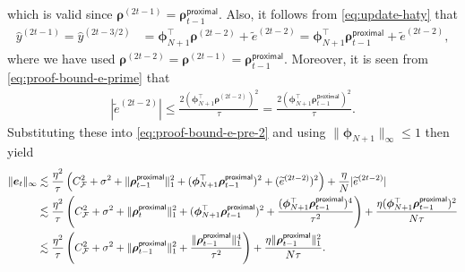 \documentclass[english]{article}
\begin{document}
%
which is valid since $ {\bm \rho}^{(2t-1)} = {\bm \rho}_{t-1}^{\mathsf{proximal}}$.
Also, it follows from \eqref{eq:update-haty} that
%
\begin{align*}
\widehat{y}^{(2t-1)} 
 = \widehat{y}^{(2t-3/2)} 
&=  {\bm \phi}_{N+1}^{\top}{\bm \rho}^{(2t-2)} + \widetilde{e}^{(2t-2)}
=  {\bm \phi}_{N+1}^{\top}{\bm \rho}_{t-1}^{\mathsf{proximal}} + \widetilde{e}^{(2t-2)},
\end{align*}
where we have used ${\bm \rho}^{(2t-2)} = {\bm \rho}^{(2t-1)} = {\bm \rho}_{t-1}^{\mathsf{proximal}}$.
Moreover, it is seen from \eqref{eq:proof-bound-e-prime} that
%
\begin{align*}
|\widetilde{e}^{(2t-2)}|\le \frac{2\left({\bm \phi}_{N+1}^{\top}{\bm \rho}^{(2t-2)}\right)^2}{\tau} = \frac{2\left({\bm \phi}_{N+1}^{\top}{\bm \rho}_{t-1}^{\mathsf{proximal}}\right)^2}{\tau}.
\end{align*}
%
Substituting these into \eqref{eq:proof-bound-e-pre-2} and using $\|\bm{\phi}_{N+1}\|_{\infty}\leq 1$ then yield
%
\begin{align}\label{eq:proof-bound-e}
\|{\bm e}_{t}\|_{\infty}
&\lesssim \frac{\eta^2}{\tau}\left(C_{\mathcal{F}}^2 + \sigma^2 + \|{\bm \rho}_{t-1}^{\mathsf{proximal}}\|_1^2 + ({\bm \phi}_{N+1}^{\top}{\bm \rho}_{t-1}^{\mathsf{proximal}})^2 + (\widetilde{e}^{(2t-2)})^2\right)+ \frac{\eta}{N}|\widetilde{e}^{(2t-2)}|\notag\\
&\lesssim \frac{\eta^2}{\tau}\left(C_{\mathcal{F}}^2 +\sigma^2 + \|{\bm \rho}_t^{\mathsf{proximal}}\|_1^2 + ({\bm \phi}_{N+1}^{\top}{\bm \rho}_{t-1}^{\mathsf{proximal}})^2 + \frac{({\bm \phi}_{N+1}^{\top}{\bm \rho}_{t-1}^{\mathsf{proximal}})^4}{\tau^2}\right)+ \frac{\eta({\bm \phi}_{N+1}^{\top}{\bm \rho}_{t-1}^{\mathsf{proximal}})^2}{N\tau}\notag\\
&\lesssim \frac{\eta^2}{\tau}\left(C_{\mathcal{F}}^2 + \sigma^2 + \|{\bm \rho}_{t-1}^{\mathsf{proximal}}\|_1^2 + \frac{\|{\bm \rho}_{t-1}^{\mathsf{proximal}}\|_1^4}{\tau^2}\right)+ \frac{\eta\|{\bm \rho}_{t-1}^{\mathsf{proximal}}\|_1^2}{N\tau}.
\end{align}
\end{document}
